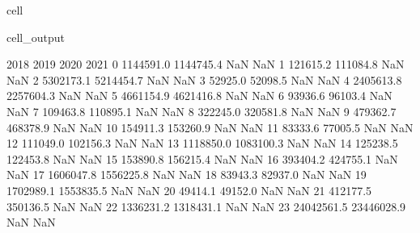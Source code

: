 \documentclass[letterpaper,10pt,english]{jupyterBook}
\begin{document}
\begin{sphinxuseclass}{cell}
\begin{sphinxVerbatimOutput}
\begin{sphinxuseclass}{cell_output}
\begin{sphinxVerbatim}[commandchars=\\\{\}]
          2018        2019  2020  2021  
0    1144591.0   1144745.4   NaN   NaN  
1     121615.2    111084.8   NaN   NaN  
2    5302173.1   5214454.7   NaN   NaN  
3      52925.0     52098.5   NaN   NaN  
4    2405613.8   2257604.3   NaN   NaN  
5    4661154.9   4621416.8   NaN   NaN  
6      93936.6     96103.4   NaN   NaN  
7     109463.8    110895.1   NaN   NaN  
8     322245.0    320581.8   NaN   NaN  
9     479362.7    468378.9   NaN   NaN  
10    154911.3    153260.9   NaN   NaN  
11     83333.6     77005.5   NaN   NaN  
12    111049.0    102156.3   NaN   NaN  
13   1118850.0   1083100.3   NaN   NaN  
14    125238.5    122453.8   NaN   NaN  
15    153890.8    156215.4   NaN   NaN  
16    393404.2    424755.1   NaN   NaN  
17   1606047.8   1556225.8   NaN   NaN  
18     83943.3     82937.0   NaN   NaN  
19   1702989.1   1553835.5   NaN   NaN  
20     49414.1     49152.0   NaN   NaN  
21    412177.5    350136.5   NaN   NaN  
22   1336231.2   1318431.1   NaN   NaN  
23  24042561.5  23446028.9   NaN   NaN  
\end{sphinxVerbatim}

\end{sphinxuseclass}\end{sphinxVerbatimOutput}

\end{sphinxuseclass}
\end{document}
